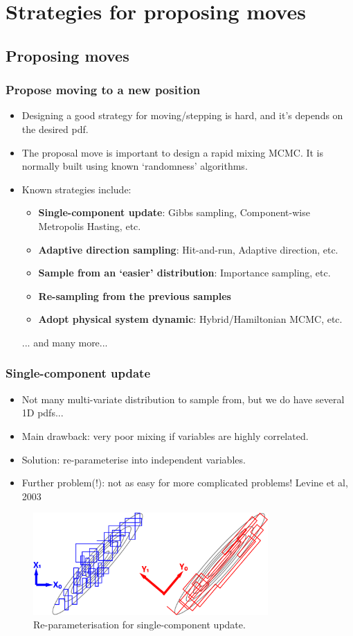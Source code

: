 \documentclass[10pt]{beamer}
\begin{document}
\section{Strategies for proposing moves}
\subsection{Proposing moves}

\begin{frame}
	\frametitle{Propose moving to a new position}
	\begin{itemize}
		\item Designing a good strategy for moving/stepping is hard, and it's depends on the desired pdf. 
		\item The proposal move is important to design a rapid mixing MCMC. It is normally built using known `randomness' algorithms.
		\item Known strategies include:
			\begin{itemize}
				\item \textbf{Single-component update}: Gibbs sampling, Component-wise Metropolis Hasting, etc.
				\item \textbf{Adaptive direction sampling}: Hit-and-run, Adaptive direction, etc.
				\item \textbf{Sample from an `easier' distribution}: Importance sampling, etc.
				\item \textbf{Re-sampling from the previous samples}
				\item \textbf{Adopt physical system dynamic}: Hybrid/Hamiltonian MCMC, etc.
			\end{itemize}
			... and many more...
	\end{itemize}
\end{frame}

\begin{frame}
	\frametitle{Single-component update}
	\begin{itemize}
		\item Not many multi-variate distribution to sample from, but we do have several 1D pdfs...
		\item Main drawback: very poor mixing if variables are highly correlated. 
		\item Solution: re-parameterise into independent variables. 
		\item Further problem(!): not as easy for more complicated problems! \tiny{Levine et al, 2003} \normalsize
	\end{itemize}
	\begin{figure}[h]
		\centering
		\includegraphics[width=0.8\textwidth]{reparameterisation}
		\caption{Re-parameterisation for single-component update.}
	\end{figure}	
\end{frame}
\end{document}
